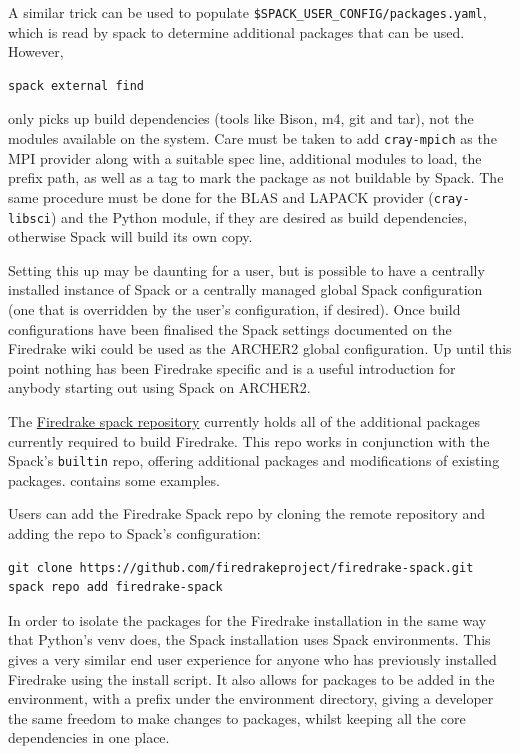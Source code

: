 \documentclass[a4paper,11pt]{article}
\begin{document}
A similar trick can be used to populate \verb`$SPACK_USER_CONFIG/packages.yaml`, which is read by spack to determine additional packages that can be used.
However,
\begin{lstlisting}[numbers=none]
spack external find	
\end{lstlisting}
only picks up build dependencies (tools like Bison, m4, git and tar), not the modules available on the system.
Care must be taken to add \verb`cray-mpich` as the MPI provider along with a suitable spec line, additional modules to load, the prefix path, as well as a tag to mark the package as not buildable by Spack.
The same procedure must be done for the BLAS and LAPACK provider (\verb`cray-libsci`) and the Python module, if they are desired as build dependencies, otherwise Spack will build its own copy.

Setting this up may be daunting for a user, but is possible to have a centrally installed instance of Spack or a centrally managed global Spack configuration (one that is overridden by the user's configuration, if desired).
Once build configurations have been finalised the Spack settings documented on the Firedrake wiki\cite{firedrakewiki} could be used as the ARCHER2 global configuration.
Up until this point nothing has been Firedrake specific and is a useful introduction for anybody starting out using Spack on ARCHER2.

The \href{https://github.com/firedrakeproject/firedrake-spack}{Firedrake spack repository} currently holds all of the additional packages currently required to build Firedrake.
This repo works in conjunction with the Spack's \verb`builtin` repo, offering additional packages and modifications of existing packages.
 contains some examples.

Users can add the Firedrake Spack repo by cloning the remote repository and adding the repo to Spack's configuration:
\begin{lstlisting}
git clone https://github.com/firedrakeproject/firedrake-spack.git
spack repo add firedrake-spack
\end{lstlisting}

In order to isolate the packages for the Firedrake installation in the same way that Python's venv does, the Spack installation uses Spack environments.
This gives a very similar end user experience for anyone who has previously installed Firedrake using the install script.
It also allows for packages to be added in the environment, with a prefix under the environment directory, giving a developer the same freedom to make changes to packages, whilst keeping all the core dependencies in one place.
\end{document}
